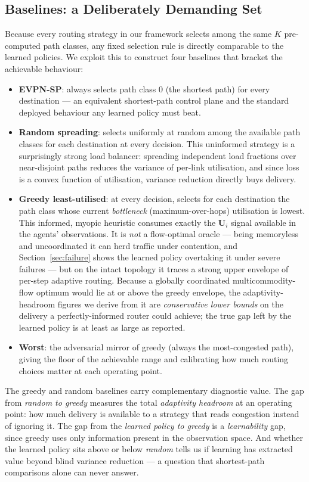 \documentclass[10pt,journal,comsoc]{IEEEtran}
\begin{document}
\subsection{Baselines: a Deliberately Demanding Set}
\label{subsec:baselines}
Because every routing strategy in our framework selects among the same $K$ pre-computed path classes, any fixed selection rule is directly comparable to the learned policies. We exploit this to construct four baselines that bracket the achievable behaviour:

\begin{itemize}
  \item \textbf{EVPN-SP}: always selects path class $0$ (the shortest path) for every destination --- an equivalent shortest-path control plane and the standard deployed behaviour any learned policy must beat.
  \item \textbf{Random spreading}: selects uniformly at random among the available path classes for each destination at every decision. This uninformed strategy is a surprisingly strong load balancer: spreading independent load fractions over near-disjoint paths reduces the variance of per-link utilisation, and since loss is a convex function of utilisation, variance reduction directly buys delivery.
  \item \textbf{Greedy least-utilised}: at every decision, selects for each destination the path class whose current \emph{bottleneck} (maximum-over-hops) utilisation is lowest. This informed, myopic heuristic consumes exactly the $\mathbf{U}_i$ signal available in the agents' observations. It is \emph{not} a flow-optimal oracle --- being memoryless and uncoordinated it can herd traffic under contention, and Section~\ref{sec:failure} shows the learned policy overtaking it under severe failures --- but on the intact topology it traces a strong upper envelope of per-step adaptive routing. Because a globally coordinated multicommodity-flow optimum would lie at or above the greedy envelope, the adaptivity-headroom figures we derive from it are \emph{conservative lower bounds} on the delivery a perfectly-informed router could achieve; the true gap left by the learned policy is at least as large as reported.
  \item \textbf{Worst}: the adversarial mirror of greedy (always the most-congested path), giving the floor of the achievable range and calibrating how much routing choices matter at each operating point.
\end{itemize}

The greedy and random baselines carry complementary diagnostic value. The gap from \emph{random to greedy} measures the total \emph{adaptivity headroom} at an operating point: how much delivery is available to a strategy that reads congestion instead of ignoring it. The gap from the \emph{learned policy to greedy} is a \emph{learnability} gap, since greedy uses only information present in the observation space. And whether the learned policy sits above or below \emph{random} tells us if learning has extracted value beyond blind variance reduction --- a question that shortest-path comparisons alone can never answer.
\end{document}
